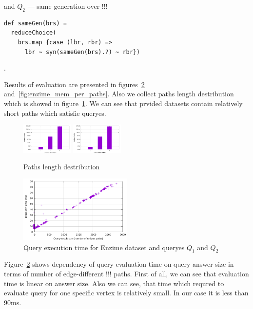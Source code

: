 and $Q_2$ --- same generation over !!!
\begin{lstlisting}
def sameGen(brs) =
  reduceChoice(
    brs.map {case (lbr, rbr) =>
      lbr ~ syn(sameGen(brs).?) ~ rbr})
\end{lstlisting}
.

Results of evaluation are presented in figures~\ref{fig:enzime_time_per_paths} and~\ref{fig:enzime_mem_per_paths}.
Also we collect paths length destribution which is showed in figure~\ref{fig:pLength}.
We can see that prvided datasets contain relatively short paths which satisfie queryes.


\begin{figure}
\centering
    {\includegraphics[width=0.23\textwidth]{data/enzime_narrowerTr_path_per_length.pdf}}
{\includegraphics[width=0.23\textwidth]{data/enzime_narrowerTr_path_per_length.pdf}}
\caption{Paths length destribution}\label{fig:pLength}
\end{figure}

\begin{figure}[ht]
  \begin{center}
    \includegraphics[width=0.5\textwidth]{data/enzime_narrowerTr_time_per_paths.pdf}
    \caption{Query execution time for Enzime dataset and queryes $Q_1$ and $Q_2$}
    \label{fig:enzime_time_per_paths}
  \end{center}
\end{figure}

Figure~\ref{fig:enzime_time_per_paths} shows dependency of query evaluation time on query answer size in terms of number of edge-different !!! paths.
First of all, we can see that evaluation time is linear on answer size.
Also we can see, that time which requred to evaluate query for one specific vertex is relatively small.
In our case it is less than 90ms.

